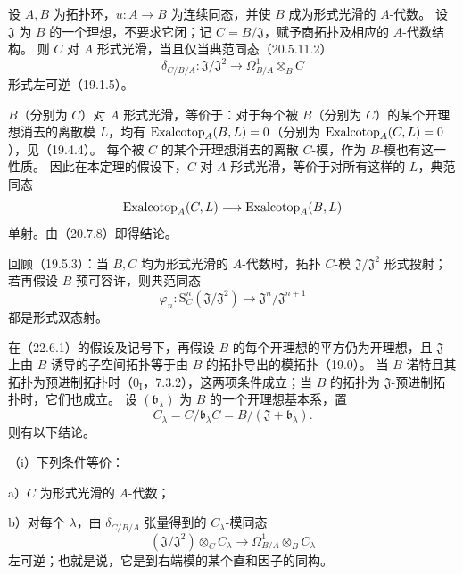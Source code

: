
设 $A,B$ 为拓扑环，$u:A\to B$ 为连续同态，并使 $B$ 成为形式光滑的 $A$-代数。
设 $\mathfrak J$ 为 $B$ 的一个理想，不要求它闭；记 $C=B/\mathfrak J$，赋予商拓扑及相应的 $A$-代数结构。
则 $C$ 对 $A$ 形式光滑，当且仅当典范同态（20.5.11.2）
\begin{equation}
 \delta_{C/B/A}:\mathfrak J/\mathfrak J^2\longrightarrow\Omega^1_{B/A}\otimes_BC
 \tag{22.6.1.1}
\end{equation}
形式左可逆（19.1.5）。

\eproof
$B$（分别为 $C$）对 $A$ 形式光滑，等价于：对于每个被 $B$（分别为 $C$）的某个开理想消去的离散模 $L$，均有
$\operatorname{Exalcotop}_A(B,L)=0$（分别为 $\operatorname{Exalcotop}_A(C,L)=0$），见（19.4.4）。
每个被 $C$ 的某个开理想消去的离散 $C$-模，作为 $B$-模也有这一性质。
因此在本定理的假设下，$C$ 对 $A$ 形式光滑，等价于对所有这样的 $L$，典范同态
\[
 \operatorname{Exalcotop}_A(C,L)\longrightarrow\operatorname{Exalcotop}_A(B,L)
\]
单射。由（20.7.8）即得结论。
\finishproof

回顾（19.5.3）：当 $B,C$ 均为形式光滑的 $A$-代数时，拓扑 $C$-模 $\mathfrak J/\mathfrak J^2$ 形式投射；
若再假设 $B$ 预可容许，则典范同态
\[
 \varphi_n:\mathrm S_C^n(\mathfrak J/\mathfrak J^2)\longrightarrow
 \mathfrak J^n/\mathfrak J^{n+1}
\]
都是形式双态射。

在（22.6.1）的假设及记号下，再假设 $B$ 的每个开理想的平方仍为开理想，且 $\mathfrak J$ 上由 $B$ 诱导的子空间拓扑等于由 $B$ 的拓扑导出的模拓扑（19.0）。
当 $B$ 诺特且其拓扑为预进制拓扑时（$0_{\mathrm I}$，7.3.2），这两项条件成立；当 $B$ 的拓扑为 $\mathfrak J$-预进制拓扑时，它们也成立。
设 $(\mathfrak b_\lambda)$ 为 $B$ 的一个开理想基本系，置
\[
 C_\lambda=C/\mathfrak b_\lambda C=B/(\mathfrak J+\mathfrak b_\lambda).
\]
则有以下结论。

\noindent（i）下列条件等价：

\noindent a）$C$ 为形式光滑的 $A$-代数；

\noindent b）对每个 $\lambda$，由 $\delta_{C/B/A}$ 张量得到的 $C_\lambda$-模同态
\begin{equation}
 (\mathfrak J/\mathfrak J^2)\otimes_CC_\lambda
 \longrightarrow\Omega^1_{B/A}\otimes_BC_\lambda
 \tag{22.6.2.1}
\end{equation}
左可逆；也就是说，它是到右端模的某个直和因子的同构。

